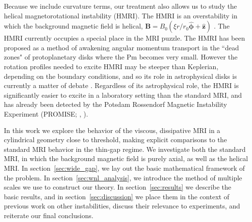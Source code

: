 \documentclass{emulateapj}
\newcommand{\citei}[1]{\citeauthor{#1} \citeyear{#1}}
\newcommand{\Pm}{\mathrm{Pm}}
\begin{document}
Because we include curvature terms, our treatment also allows us to study the helical magnetorotational instability (HMRI). The HMRI is an overstability in which the background magnetic field is helical, $\mathbf{B} = B_0 (\xi r/r_0 \mathbf{\hat{\phi}} + \mathbf{\hat{z}})$ \citet{Hollerbach:2005tr}. The HMRI currently occupies a special place in the MRI puzzle. The HMRI has been proposed as a method of awakening angular momentum transport in the ``dead zones" of protoplanetary disks where the $\Pm$ becomes very small. However the rotation profiles needed to excite HMRI may be steeper than Keplerian, depending on the boundary conditions, and so its role in astrophysical disks is currently a matter of debate \citep{Liu:2006,Rudiger:2007,Kirillov:2013}. Regardless of its astrophysical role, the HMRI is significantly easier to excite in a laboratory setting than the standard MRI, and has already been detected by the Potsdam Rossendorf Magnetic Instability Experiment (PROMISE; \citei{Stefani:2006iv}, \citei{Stefani:2009hp}).

In this work we explore the behavior of the viscous, dissipative MRI in a cylindrical geometry close to threshold, making explicit comparisons to the standard MRI behavior in the thin-gap regime. We investigate both the standard MRI, in which the background magnetic field is purely axial, as well as the helical MRI. In section~\ref{sec:wide_gap}, we lay out the basic mathematical framework of the problem. In section~\ref{sec:wnl_analysis}, we introduce the method of multiple scales we use to construct our theory. In section~\ref{sec:results} we describe the basic results, and in section~\ref{sec:discussion} we place them in the context of previous work on other instabilities, discuss their relevance to experiments, and reiterate our final conclusions.
\end{document}
